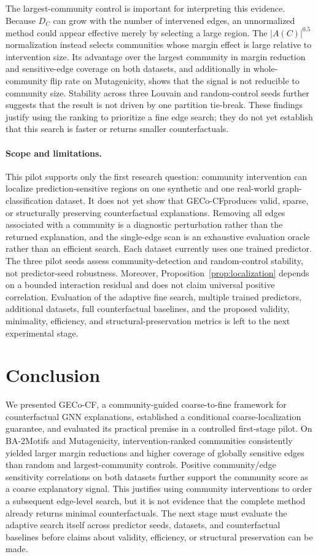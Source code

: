 \documentclass[runningheads]{llncs}
\newcommand{\method}{GECo-CF}
\begin{document}
The largest-community control is important for interpreting this evidence.
Because $D_C$ can grow with the number of intervened edges, an unnormalized
method could appear effective merely by selecting a large region. The
$|A(C)|^{0.5}$ normalization instead selects communities whose margin effect
is large relative to intervention size. Its advantage over the largest
community in margin reduction and sensitive-edge coverage on both datasets,
and additionally in whole-community flip rate on Mutagenicity, shows that the
signal is not reducible to community size. Stability across three Louvain and
random-control seeds further suggests that the result is not driven by one
partition tie-break. These findings justify using the ranking to prioritize a
fine edge search; they do not yet establish that this search is faster or
returns smaller counterfactuals.

\paragraph{Scope and limitations.}
This pilot supports only the first research question: community intervention
can localize prediction-sensitive regions on one synthetic and one real-world
graph-classification dataset. It does not yet show that \method produces
valid, sparse, or structurally preserving counterfactual explanations.
Removing all edges associated with a community is a diagnostic perturbation
rather than the returned explanation, and the single-edge scan is an
exhaustive evaluation oracle rather than an efficient search. Each dataset
currently uses one trained predictor. The three pilot seeds assess
community-detection and random-control stability, not predictor-seed
robustness. Moreover, Proposition~\ref{prop:localization} depends on a bounded
interaction residual and does not claim universal positive correlation.
Evaluation of the adaptive fine search, multiple trained predictors,
additional datasets, full counterfactual baselines, and the proposed validity,
minimality, efficiency, and structural-preservation metrics is left to the
next experimental stage.

\section{Conclusion}
\label{sec:conclusion}
We presented \method, a community-guided coarse-to-fine framework for
counterfactual GNN explanations, established a conditional coarse-localization
guarantee, and evaluated its practical premise in a controlled first-stage
pilot. On BA-2Motifs and Mutagenicity, intervention-ranked communities
consistently yielded larger margin reductions and higher coverage of globally
sensitive edges than random and largest-community controls. Positive
community/edge sensitivity correlations on both datasets further support the
community score as a coarse explanatory signal. This justifies using
community interventions to order a subsequent edge-level search, but it is not
evidence that the complete method already returns minimal counterfactuals. The
next stage must evaluate the adaptive search itself across predictor seeds,
datasets, and counterfactual baselines before claims about validity,
efficiency, or structural preservation can be made.



\end{document}
